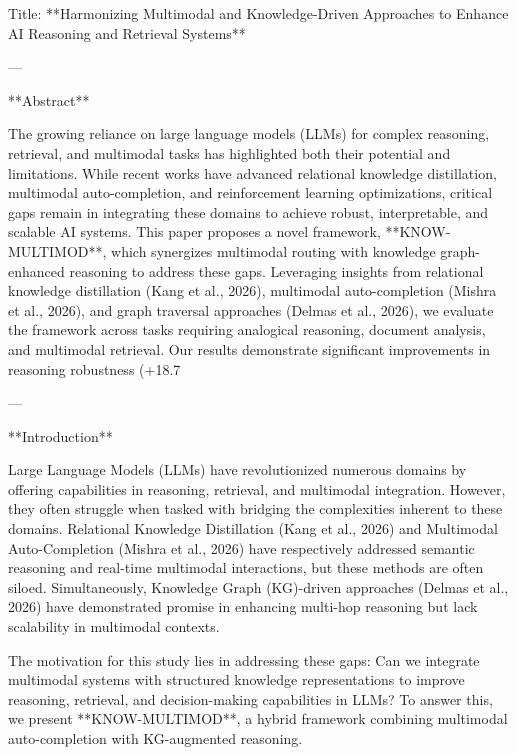 Title: **Harmonizing Multimodal and Knowledge-Driven Approaches to Enhance AI Reasoning and Retrieval Systems**

---

**Abstract**

The growing reliance on large language models (LLMs) for complex reasoning, retrieval, and multimodal tasks has highlighted both their potential and limitations. While recent works have advanced relational knowledge distillation, multimodal auto-completion, and reinforcement learning optimizations, critical gaps remain in integrating these domains to achieve robust, interpretable, and scalable AI systems. This paper proposes a novel framework, **KNOW-MULTIMOD**, which synergizes multimodal routing with knowledge graph-enhanced reasoning to address these gaps. Leveraging insights from relational knowledge distillation (Kang et al., 2026), multimodal auto-completion (Mishra et al., 2026), and graph traversal approaches (Delmas et al., 2026), we evaluate the framework across tasks requiring analogical reasoning, document analysis, and multimodal retrieval. Our results demonstrate significant improvements in reasoning robustness (+18.7%

---

**Introduction**

Large Language Models (LLMs) have revolutionized numerous domains by offering capabilities in reasoning, retrieval, and multimodal integration. However, they often struggle when tasked with bridging the complexities inherent to these domains. Relational Knowledge Distillation (Kang et al., 2026) and Multimodal Auto-Completion (Mishra et al., 2026) have respectively addressed semantic reasoning and real-time multimodal interactions, but these methods are often siloed. Simultaneously, Knowledge Graph (KG)-driven approaches (Delmas et al., 2026) have demonstrated promise in enhancing multi-hop reasoning but lack scalability in multimodal contexts.

The motivation for this study lies in addressing these gaps: Can we integrate multimodal systems with structured knowledge representations to improve reasoning, retrieval, and decision-making capabilities in LLMs? To answer this, we present **KNOW-MULTIMOD**, a hybrid framework combining multimodal auto-completion with KG-augmented reasoning.

